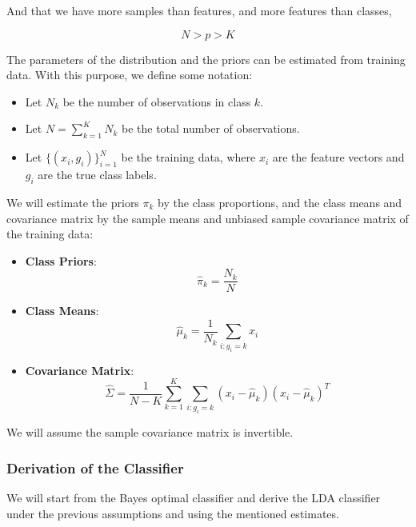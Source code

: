 And that we have more samples than features, and more features than classes,

\[
N > p > K
\]

The parameters of the distribution and the priors can be estimated from training data. With this purpose, we define some notation:

\begin{itemize}
    \item Let $N_k$ be the number of observations in class $k$.
    \item Let $N = \sum_{k=1}^K N_k$ be the total number of observations.
    \item Let $\{(x_i, g_i)\}_{i=1}^N$ be the training data, where $x_i$ are the feature vectors and $g_i$ are the true class labels.
\end{itemize}

We will estimate the priors $\pi_k$ by the class proportions, and the class means and covariance matrix by the sample means and unbiased sample covariance matrix of the training data:

\begin{itemize}
    \item \textbf{Class Priors}:
    \[
    \hat{\pi}_k = \frac{N_k}{N}
    \]
    \item \textbf{Class Means}:
    \[
    \hat{\mu}_k = \frac{1}{N_k} \sum_{i: g_i = k} x_i
    \]
    \item \textbf{Covariance Matrix}:
    \begin{equation}
    \hat{\Sigma} = \frac{1}{N - K} \sum_{k=1}^K \sum_{i: g_i = k} (x_i - \hat{\mu}_k)(x_i - \hat{\mu}_k)^T \label{eq:sample-covariance}
    \end{equation}
\end{itemize}

We will assume the sample covariance matrix is invertible.

\subsubsection{Derivation of the Classifier}

We will start from the Bayes optimal classifier and derive the LDA classifier under the previous assumptions and using the mentioned estimates.

